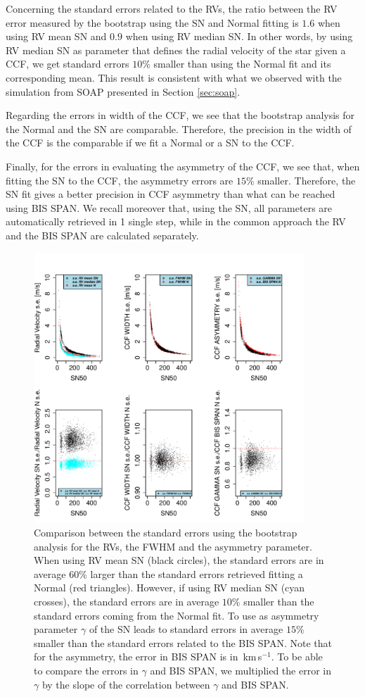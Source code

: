 \documentclass[11pt, oneside]{article}
\def\kms{\hbox{\,km\,s$^{-1}$}}       %
\begin{document}
Concerning the standard errors related to the RVs, the ratio between the RV error measured by the bootstrap using the SN and Normal fitting is $1.6$ when using RV mean SN and $0.9$ when using RV median SN. In other words, by using RV median SN as parameter that defines the radial velocity of the star given a CCF, we get standard errors $10\%$ smaller than using the Normal fit and its corresponding mean. This result is consistent with what we observed with the simulation from SOAP presented in Section \ref{sec:soap}.

Regarding the errors in width of the CCF, we see that the bootstrap analysis for the Normal and the SN are comparable. Therefore, the precision in the width of the CCF is the comparable if we fit a Normal or a SN to the CCF.

Finally, for the errors in evaluating the asymmetry of the CCF, we see that, when fitting the SN to the CCF, the asymmetry errors are $15\%$ smaller. Therefore, the SN fit gives a better precision in CCF asymmetry than what can be reached using BIS SPAN. We recall moreover that, using the SN, all parameters are automatically retrieved in 1 single step, while in the common approach the RV and the BIS SPAN are calculated separately.

%
\begin{figure}[htbp]
   \centering
\includegraphics[height = 4in]{[5]Errors_vs_SNR_all_stars.pdf} 
   \caption{Comparison between the standard errors using the bootstrap analysis for the RVs, the FWHM and the asymmetry parameter. When using RV mean SN (black circles), the standard errors are in average $60\%$ larger than the standard errors retrieved fitting a Normal (red triangles). However, if using RV median SN (cyan crosses), the standard errors are in average $10\%$ smaller than the standard errors coming from the Normal fit. To use as asymmetry parameter $\gamma$ of the SN leads to standard errors in average $15\%$ smaller than the standard errors related to the BIS SPAN. Note that for the asymmetry, the error in BIS SPAN is in \kms. To be able to compare the errors in $\gamma$ and BIS SPAN, we multiplied the error in $\gamma$ by the slope of the correlation between $\gamma$ and BIS SPAN.}
   \label{fig:se}
\end{figure}
\end{document}
